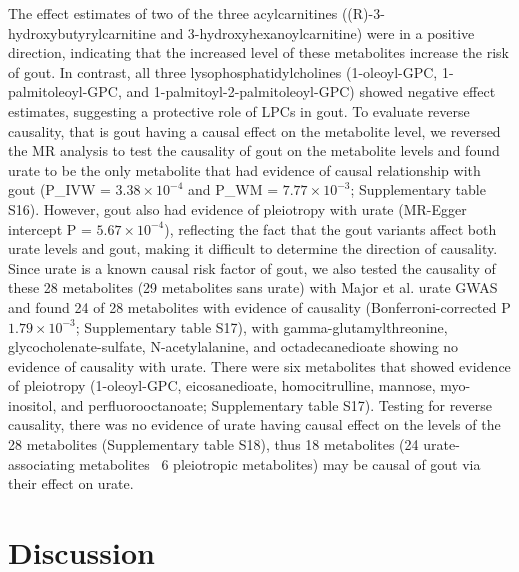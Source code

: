 \documentclass[gucdd,article,submit,pdftex,moreauthors]{Definitions/mdpi}
\begin{document}
The effect estimates of two of the three acylcarnitines ((R)-3-hydroxy\-butyryl\-carnitine and 3-hydroxy\-hexanoyl\-carnitine) were in a positive direction, indicating that the increased level of these metabolites increase the risk of gout.
In contrast, all three lysophosphatidylcholines (1-oleoyl-GPC, 1-palmitoleoyl-GPC, and 1-palmitoyl-2-palmitoleoyl-GPC) showed negative effect estimates, suggesting a protective role of LPCs in gout.
To evaluate reverse causality, that is gout having a causal effect on the metabolite level, we reversed the MR analysis to test the causality of gout on the metabolite levels and found urate to be the only metabolite that had evidence of causal relationship with gout (P_{IVW} = $3.38\times10^{-4}$ and P_{WM} = $7.77\times10^{-3}$; Supplementary table S16).
However, gout also had evidence of pleiotropy with urate (MR-Egger intercept P = $5.67\times10^{-4}$), reflecting the fact that the gout variants affect both urate levels and gout, making it difficult to determine the direction of causality.
Since urate is a known causal risk factor of gout, we also tested the causality of these 28 metabolites (29 metabolites sans urate) with Major et al. \citep{major_genome-wide_2024} urate GWAS and found 24 of 28 metabolites with evidence of causality (Bonferroni-corrected P \le $1.79\times10^{-3}$; Supplementary table S17), with gamma-glutamylthreonine, glycocholenate-sulfate, N-acetylalanine, and octadecanedioate showing no evidence of causality with urate.
There were six metabolites that showed evidence of pleiotropy (1-oleoyl-GPC, eicosanedioate, homocitrulline, mannose, myo-inositol, and perfluorooctanoate; Supplementary table S17).
Testing for reverse causality, there was no evidence of urate having causal effect on the levels of the 28 metabolites (Supplementary table S18), thus 18 metabolites (24 urate-associating metabolites \textminus\ 6 pleiotropic metabolites) may be causal of gout via their effect on urate.

\section{Discussion}
\end{document}
